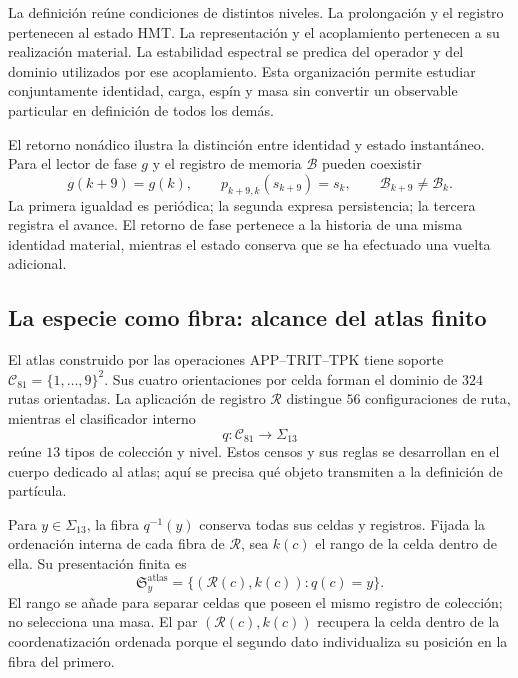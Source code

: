 La definición reúne condiciones de distintos niveles. La prolongación
y el registro pertenecen al estado HMT. La representación y el
acoplamiento pertenecen a su realización material. La estabilidad
espectral se predica del operador y del dominio utilizados por ese
acoplamiento. Esta organización permite estudiar conjuntamente identidad,
carga, espín y masa sin convertir un observable particular en definición
de todos los demás.

El retorno nonádico ilustra la distinción entre identidad y estado
instantáneo. Para el lector de fase $g$ y el registro de memoria
$\mathcal B$ pueden coexistir
\begin{equation}
 g(k+9)=g(k),\qquad
 p_{k+9,k}(s_{k+9})=s_k,\qquad
 \mathcal B_{k+9}\ne\mathcal B_k.
 \label{vi:eq:persistencia-fase-memoria}
\end{equation}
La primera igualdad es periódica; la segunda expresa persistencia; la
tercera registra el avance. El retorno de fase pertenece a la historia
de una misma identidad material, mientras el estado conserva que se ha
efectuado una vuelta adicional.

\subsection{La especie como fibra: alcance del atlas finito}
\label{vi:subsec:especie-fibra}

El atlas construido por las operaciones APP--TRIT--TPK tiene soporte
$\mathcal C_{81}=\{1,\ldots,9\}^2$. Sus cuatro orientaciones por
celda forman el dominio de $324$ rutas orientadas. La aplicación de
registro $\mathcal R$ distingue $56$ configuraciones de ruta, mientras el
clasificador interno
\begin{equation}
 q:\mathcal C_{81}\longrightarrow\Sigma_{13}
 \label{vi:eq:clasificador-especies}
\end{equation}
reúne $13$ tipos de colección y nivel. Estos censos y sus reglas se
desarrollan en el cuerpo dedicado al atlas; aquí se precisa qué objeto
transmiten a la definición de partícula.

Para $y\in\Sigma_{13}$, la fibra $q^{-1}(y)$ conserva todas sus
celdas y registros. Fijada la ordenación interna de cada fibra de
$\mathcal R$, sea $k(c)$ el rango de la celda dentro de ella. Su
presentación finita es
\begin{equation}
 \mathfrak S_y^{\mathrm{atlas}}
 =\{(\mathcal R(c),k(c)):q(c)=y\}.
 \label{vi:eq:multiseccion-atlas}
\end{equation}
El rango se añade para separar celdas que poseen el mismo registro de
colección; no selecciona una masa. El par $(\mathcal R(c),k(c))$
recupera la celda dentro de la coordenatización ordenada porque el segundo dato
individualiza su posición en la fibra del primero.

